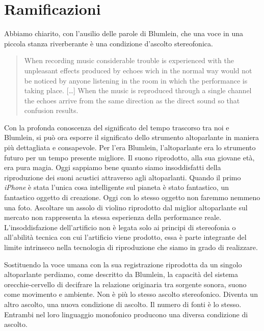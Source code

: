 \section{Ramificazioni}

Abbiamo chiarito, con l'ausilio delle parole di Blumlein, che una voce in
una piccola stanza riverberante è una condizione d'ascolto stereofonica.

\begin{quote}
When recording music considerable trouble is experienced with the unpleasant
effects produced by echoes wich in the normal way would not be noticed by anyone
listening in the room in which the performance is taking place. [\ldots]
When the music is reproduced through a single channel the echoes arrive from
the same direction as the direct sound so that confusion results.
\end{quote}

Con la profonda conoscenza del significato del tempo trascorso tra noi e Blumlein,
si può ora esporre il significato dello strumento altoparlante in maniera più
dettagliata e consapevole. Per l'era Blumlein, l'altoparlante era lo strumento
futuro per un tempo presente migliore. Il suono riprodotto, alla sua giovane età,
era pura magia. Oggi sappiamo bene quanto siamo insoddisfatti della riproduzione
dei suoni acustici attraverso agli altoparlanti. Quando il primo \emph{iPhone} è
stata l'unica cosa intelligente sul pianeta è stato fantastico, un fantastico
oggetto di creazione. Oggi con lo stesso oggetto non faremmo nemmeno una foto.
Ascoltare un assolo di violino riprodotto dal miglior altoparlante sul mercato
non rappresenta la stessa esperienza della performance reale. L'insoddisfazione
dell'artificio non è legata solo ai principi di stereofonia o all'abilità tecnica
con cui l'artificio viene prodotto, essa è parte integrante del limite intrinseco
nella tecnologia di riproduzione che siamo in grado di realizzare.

Sostituendo la voce umana con la sua registrazione riprodotta da un singolo
altoparlante perdiamo, come descritto da Blumlein, la capacità del sistema
orecchie-cervello di decifrare la relazione originaria tra sorgente sonora, suono
come movimento e ambiente. Non è più lo stesso ascolto stereofonico. Diventa un
altro ascolto, una nuova condizione di ascolto. Il numero di fonti è lo stesso.
Entrambi nel loro linguaggio monofonico producono una diversa condizione di ascolto.

